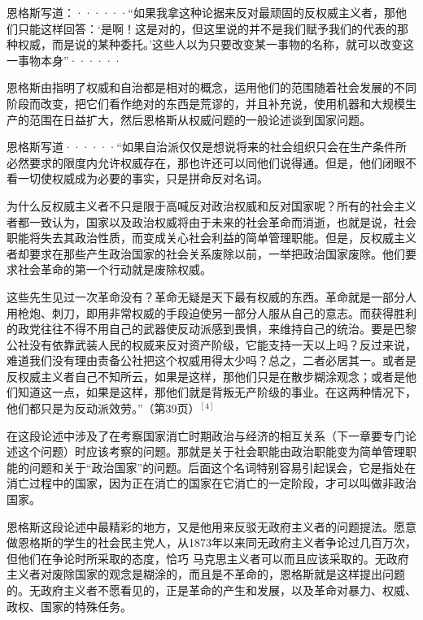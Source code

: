 \pskip
\leftskip=10mm
\small

恩格斯写道：······“如果我拿这种论据来反对最顽固的反权威主义者，那他们只能这样回答：‘是啊！这是对的，但这里说的并不是我们赋予我们的代表的那种权威，而是说的某种委托。’这些人以为只要改变某一事物的名称，就可以改变这一事物本身”······

\normalsize
\leftskip=0mm
\pskip

恩格斯由指明了权威和自治都是相对的概念，运用他们的范围随着社会发展的不同阶段而改变，把它们看作绝对的东西是荒谬的，并且补充说，使用机器和大规模生产的范围在日益扩大，然后恩格斯从权威问题的一般论述谈到国家问题。

\pskip
\leftskip=10mm
\small

恩格斯写道······“如果自治派仅仅是想说将来的社会组织只会在生产条件所必然要求的限度内允许权威存在，那也许还可以同他们说得通。但是，他们闭眼不看一切使权威成为必要的事实，只是拼命反对名词。

为什么反权威主义者不只是限于高喊反对政治权威和反对国家呢？所有的社会主义者都一致认为，国家以及政治权威将由于未来的社会革命而消逝，也就是说，社会职能将失去其政治性质，而变成关心社会利益的简单管理职能。但是，反权威主义者却要求在那些产生政治国家的社会关系废除以前，一举把政治国家废除。他们要求社会革命的第一个行动就是废除权威。

这些先生见过一次革命没有？革命无疑是天下最有权威的东西。革命就是一部分人用枪炮、刺刀，即用非常权威的手段迫使另一部分人服从自己的意志。而获得胜利的政党往往不得不用自己的武器使反动派感到畏惧，来维持自己的统治。要是巴黎公社没有依靠武装人民的权威来反对资产阶级，它能支持一天以上吗？反过来说，难道我们没有理由责备公社把这个权威用得太少吗？总之，二者必居其一。或者是反权威主义者自己不知所云，如果是这样，那他们只是在散步糊涂观念；或者是他们知道这一点，如果是这样，那他们就是背叛无产阶级的事业。在这两种情况下，他们都只是为反动派效劳。”（第39页）$^{[4]}$

\normalsize
\leftskip=0mm
\pskip
{}

在这段论述中涉及了在考察国家消亡时期政治与经济的相互关系（下一章要专门论述这个问题）时应该考察的问题。那就是关于社会职能由政治职能变为简单管理职能的问题和关于“政治国家”的问题。后面这个名词特别容易引起误会，它是指处在消亡过程中的国家，因为正在消亡的国家在它消亡的一定阶段，才可以叫做非政治国家。

恩格斯这段论述中最精彩的地方，又是他用来反驳无政府主义者的问题提法。愿意做恩格斯的学生的社会民主党人，从1873年以来同无政府主义者争论过几百万次，但他们在争论时所采取的态度，恰巧 马克思主义者可以而且应该采取的。无政府主义者对废除国家的观念是糊涂的，而且是{\kaishu 不革命的}，恩格斯就是这样提出问题的。无政府主义者不愿看见的，正是革命的产生和发展，以及革命对暴力、权威、政权、国家的特殊任务。

